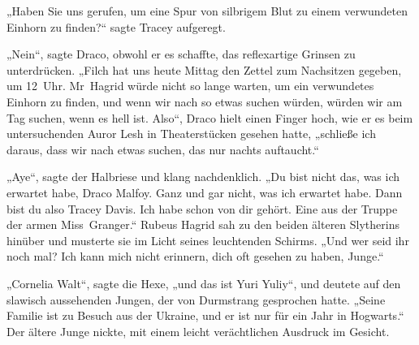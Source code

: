 „Haben Sie uns gerufen, um eine Spur von silbrigem Blut zu einem verwundeten Einhorn zu finden?“ sagte Tracey aufgeregt.

„Nein“, sagte Draco, obwohl er es schaffte, das reflexartige Grinsen zu unterdrücken. „Filch hat uns heute Mittag den Zettel zum Nachsitzen gegeben, um 12~Uhr. Mr~Hagrid würde nicht so lange warten, um ein verwundetes Einhorn zu finden, und wenn wir nach so etwas suchen würden, würden wir am Tag suchen, wenn es hell ist. Also“, Draco hielt einen Finger hoch, wie er es beim untersuchenden Auror Lesh in Theaterstücken gesehen hatte, „schließe ich daraus, dass wir nach etwas suchen, das nur nachts auftaucht.“

„Aye“, sagte der Halbriese und klang nachdenklich. „Du bist nicht das, was ich erwartet habe, Draco Malfoy. Ganz und gar nicht, was ich erwartet habe. Dann bist du also Tracey Davis. Ich habe schon von dir gehört. Eine aus der Truppe der armen Miss~Granger.“ Rubeus Hagrid sah zu den beiden älteren Slytherins hinüber und musterte sie im Licht seines leuchtenden Schirms. „Und wer seid ihr noch mal? Ich kann mich nicht erinnern, dich oft gesehen zu haben, Junge.“

„Cornelia Walt“, sagte die Hexe, „und das ist Yuri Yuliy“, und deutete auf den slawisch aussehenden Jungen, der von Durmstrang gesprochen hatte. „Seine Familie ist zu Besuch aus der Ukraine, und er ist nur für ein Jahr in Hogwarts.“
Der ältere Junge nickte, mit einem leicht verächtlichen Ausdruck im Gesicht.

